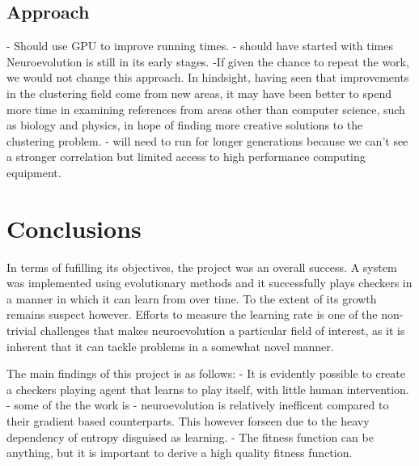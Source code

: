 \documentclass[12pt,a4paper]{article}
\begin{document}
    \subsection{Approach}
    - Should use GPU to improve running times.
    - should have started with times
    Neuroevolution is still in its early stages.
    -If given the chance to repeat the work, we would not change this approach. In hindsight, having seen that improvements in the clustering field come from new areas, it may have been better to spend more time in examining references from areas other than computer science, such as biology and physics, in hope of finding more creative solutions to the clustering problem.
    - will need to run for longer generations because we can't see a stronger correlation but limited access to high performance computing equipment.


\section{Conclusions}

    In terms of fufilling its objectives, the project was an overall success. A system was implemented using evolutionary methods and it successfully plays checkers in a manner in which it can learn from over time. To the extent of its growth remains suspect however. Efforts to measure the learning rate is one of the non-trivial challenges that makes neuroevolution a particular field of interest, as it is inherent that it can tackle problems in a somewhat novel manner.
    
    The main findings of this project is as follows:
    - It is evidently possible to create a checkers playing agent that learns to play itself, with little human intervention.
    - some of the the work is 
    - neuroevolution is relatively inefficent compared to their gradient based counterparts. This however forseen due to the heavy dependency of entropy disguised as learning.
    - The fitness function can be anything, but it is important to derive a high quality fitness function.
    
\end{document}
